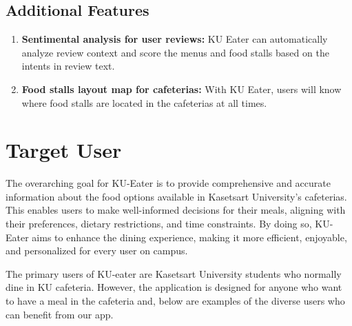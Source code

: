 \subsection{Additional Features}
\label{subsection:additional-features}

\begin{enumerate}[leftmargin=80pt]
    \item \textbf{Sentimental analysis for user reviews:} KU Eater can automatically analyze review context and score the menus and food stalls based on the intents in review text.
    \item \textbf{Food stalls layout map for cafeterias:} With KU Eater, users will know where food stalls are located in the cafeterias at all times.
\end{enumerate}

\section{Target User}
\label{section:target-user}

The overarching goal for KU-Eater is to provide comprehensive and accurate information about the food options available in
Kasetsart University's cafeterias. This enables users to make well-informed decisions for their meals,
aligning with their preferences, dietary restrictions, and time constraints. By doing so, KU-Eater aims to enhance
the dining experience, making it more efficient, enjoyable, and personalized for every user on campus.

The primary users of KU-eater are Kasetsart University students who normally dine in KU cafeteria.
However, the application is designed for anyone who want to have a meal in the cafeteria and,
below are examples of the diverse users who can benefit from our app.

